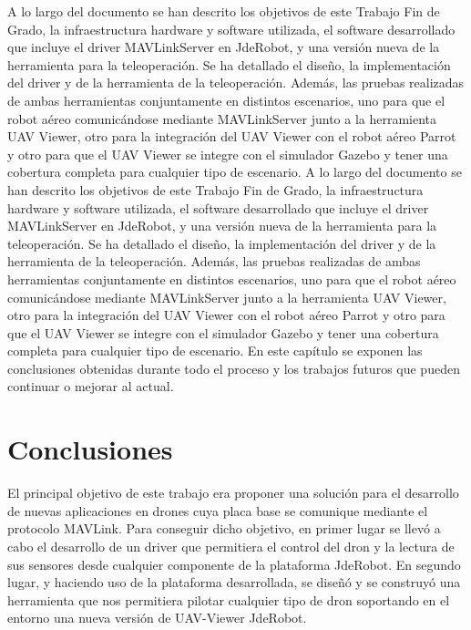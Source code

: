 A lo largo del documento se han descrito los objetivos de este Trabajo Fin de Grado, la infraestructura hardware y software utilizada, el software desarrollado que incluye el driver MAVLinkServer en JdeRobot, y una versión nueva de la herramienta para la teleoperación. Se ha detallado el diseño, la implementación del driver y de la herramienta de la teleoperación. Además, las pruebas realizadas de ambas herramientas conjuntamente en distintos escenarios, uno para que el robot aéreo comunicándose mediante MAVLinkServer junto a la herramienta UAV Viewer, otro para la integración del UAV Viewer con el robot aéreo Parrot y otro para que el UAV Viewer se integre con el simulador Gazebo y tener una cobertura completa para cualquier tipo de escenario. A lo largo del documento se han descrito los objetivos de este Trabajo Fin de Grado, la infraestructura hardware y software utilizada, el software desarrollado que incluye el driver MAVLinkServer en JdeRobot, y una versión nueva de la herramienta para la teleoperación. Se ha detallado el diseño, la implementación del driver y de la herramienta de la teleoperación. Además, las pruebas realizadas de ambas herramientas conjuntamente en distintos escenarios, uno para que el robot aéreo comunicándose mediante MAVLinkServer junto a la herramienta UAV Viewer, otro para la integración del UAV Viewer con el robot aéreo Parrot y otro para que el UAV Viewer se integre con el simulador Gazebo y tener una cobertura completa para cualquier tipo de escenario. En este capítulo se exponen las conclusiones obtenidas durante todo el proceso y los trabajos futuros que pueden continuar o mejorar al actual.

\section{Conclusiones}

El principal objetivo de este trabajo era proponer una solución para el desarrollo de nuevas aplicaciones en drones cuya placa base se comunique mediante el protocolo MAVLink. Para conseguir dicho objetivo, en primer lugar se llevó a cabo el desarrollo de un driver que permitiera el control del dron y la lectura de sus sensores desde cualquier componente de la plataforma JdeRobot. En segundo lugar, y haciendo uso de la plataforma desarrollada, se diseñó y se construyó una herramienta que nos permitiera pilotar cualquier tipo de dron soportando en el entorno una nueva versión de UAV-Viewer JdeRobot.

